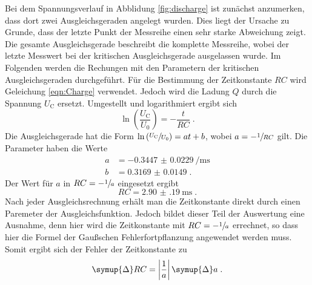 \noindent Bei dem Spannungsverlauf in Abblidung \ref{fig:discharge} ist zunächst anzumerken, dass dort zwei Ausgleichsgeraden angelegt wurden. 
Dies liegt der Ursache zu Grunde, dass der letzte Punkt der Messreihe einen sehr starke Abweichung zeigt.
Die gesamte Ausgleichsgerade beschreibt die komplette Messreihe, wobei der letzte Messwert bei der kritischen Ausgleichsgerade ausgelassen wurde.
Im Folgenden werden die Rechungen mit den Parametern der kritischen Ausgleichsgeraden durchgeführt.
Für die Bestimmung der Zeitkonstante $RC$ wird Geleichung \eqref{eqn:Charge} verwendet.
Jedoch wird die Ladung $Q$ durch die Spannung $U_\text{C}$ ersetzt.
Umgestellt und logarithmiert ergibt sich 
\begin{equation}
    \ln \left( \frac{U_\text{C}}{U_0} \right ) =  - \frac{t}{RC} \; \text{.} 
\end{equation} 
Die Ausgleichsgerade hat die Form $ \ln \left( \sfrac{U_\text{C}}{U_0} \right ) = at + b$, wobei $a = - \sfrac{1}{RC}$ gilt.
Die Parameter haben die Werte 
\begin{align*}
    a &= \SI{-0.3447(229)}{\per\milli\second} \\
    b &= \num{0.3169(149)} \; \text{.}
\end{align*}
Der Wert für $a$ in $RC = - \sfrac{1}{a}$ eingesetzt ergibt
\begin{equation*}
   RC = \SI{2.90(19)}{\milli\second} \; \text{.}
\end{equation*}
Nach jeder Ausgleichsrechnung erhält man die Zeitkonstante direkt durch einen Paremeter der Ausgleichsfunktion.
Jedoch bildet dieser Teil der Auswertung eine Ausnahme, denn hier wird die Zeitkonstante mit $RC = - \sfrac{1}{a}$ errechnet, so dass hier die Formel der Gaußschen
Fehlerfortpflanzung angewendet werden muss.
Somit ergibt sich der Fehler der Zeitkonstante zu 
\begin{equation}
    \symup{\Delta} RC = \abs*{\frac{1}{a}} \, \symup{\Delta} a \; \text{.}
\end{equation}
